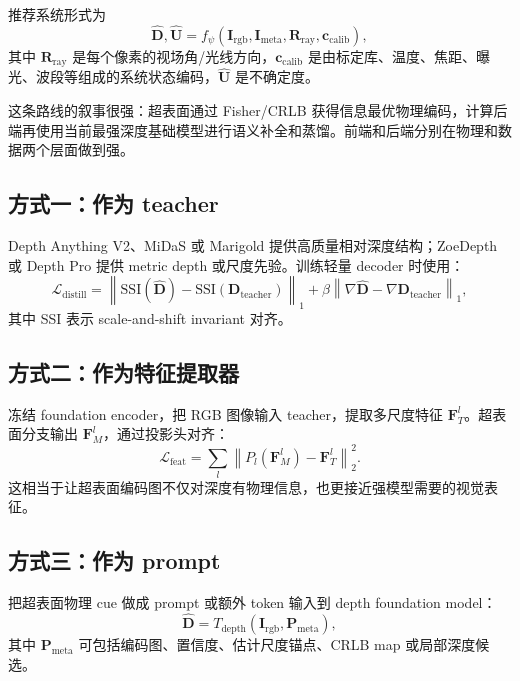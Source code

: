 \documentclass[11pt,a4paper,fontset=none]{ctexart}
\begin{document}
推荐系统形式为
\begin{equation}
  \hat{\bm D},\hat{\bm U}
  =
  f_\psi(
    \bm I_{\mathrm{rgb}},
    \bm I_{\mathrm{meta}},
    \bm R_{\mathrm{ray}},
    \bm c_{\mathrm{calib}}
  ),
\end{equation}
其中 $\bm R_{\mathrm{ray}}$ 是每个像素的视场角/光线方向，$\bm c_{\mathrm{calib}}$ 是由标定库、温度、焦距、曝光、波段等组成的系统状态编码，$\hat{\bm U}$ 是不确定度。

这条路线的叙事很强：超表面通过 Fisher/CRLB 获得信息最优物理编码，计算后端再使用当前最强深度基础模型进行语义补全和蒸馏。前端和后端分别在物理和数据两个层面做到强。

\subsection{方式一：作为 teacher}

Depth Anything V2、MiDaS 或 Marigold 提供高质量相对深度结构；ZoeDepth 或 Depth Pro 提供 metric depth 或尺度先验。训练轻量 decoder 时使用：
\begin{equation}
  \mathcal L_{\mathrm{distill}}
  =
  \left\|
  \mathrm{SSI}(\hat{\bm D}) -
  \mathrm{SSI}(\bm D_{\mathrm{teacher}})
  \right\|_1
  +
  \beta
  \left\|
  \nabla \hat{\bm D} -
  \nabla \bm D_{\mathrm{teacher}}
  \right\|_1,
\end{equation}
其中 SSI 表示 scale-and-shift invariant 对齐。

\subsection{方式二：作为特征提取器}

冻结 foundation encoder，把 RGB 图像输入 teacher，提取多尺度特征 $\bm F_T^l$。超表面分支输出 $\bm F_M^l$，通过投影头对齐：
\begin{equation}
  \mathcal L_{\mathrm{feat}}
  =
  \sum_l
  \left\|
  P_l(\bm F_M^l) - \bm F_T^l
  \right\|_2^2.
\end{equation}
这相当于让超表面编码图不仅对深度有物理信息，也更接近强模型需要的视觉表征。

\subsection{方式三：作为 prompt}

把超表面物理 cue 做成 prompt 或额外 token 输入到 depth foundation model：
\begin{equation}
  \hat{\bm D}
  =
  T_{\mathrm{depth}}
  (\bm I_{\mathrm{rgb}}, \bm P_{\mathrm{meta}}),
\end{equation}
其中 $\bm P_{\mathrm{meta}}$ 可包括编码图、置信度、估计尺度锚点、CRLB map 或局部深度候选。
\end{document}
